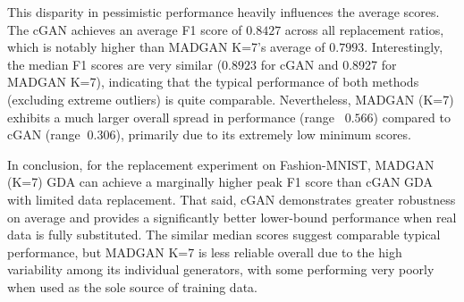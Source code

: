 This disparity in pessimistic performance heavily influences the average scores. The cGAN achieves an average F1 score of $0.8427$ across all replacement ratios, which is notably higher than MADGAN K=7's average of $0.7993$. Interestingly, the median F1 scores are very similar ($0.8923$ for cGAN and 0.8927 for MADGAN K=7), indicating that the typical performance of both methods (excluding extreme outliers) is quite comparable. Nevertheless, MADGAN (K=7) exhibits a much larger overall spread in performance (range ~$0.566$) compared to cGAN (range $~0.306$), primarily due to its extremely low minimum scores.

In conclusion, for the replacement experiment on Fashion-MNIST, MADGAN (K=7) GDA can achieve a marginally higher peak F1 score than cGAN GDA with limited data replacement. That said, cGAN demonstrates greater robustness on average and provides a significantly better lower-bound performance when real data is fully substituted. The similar median scores suggest comparable typical performance, but MADGAN K=7 is less reliable overall due to the high variability among its individual generators, with some performing very poorly when used as the sole source of training data.

